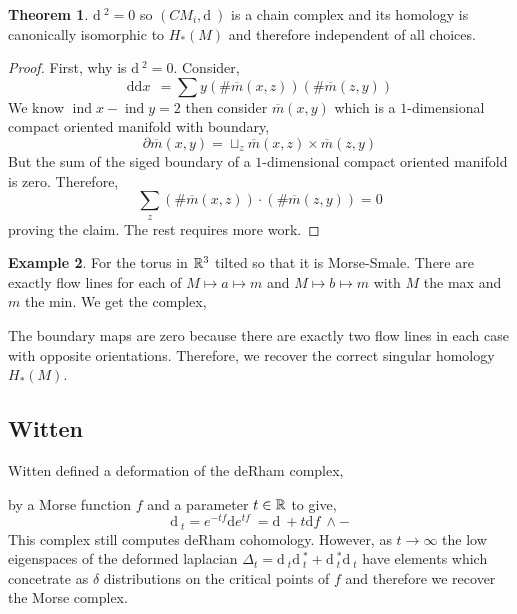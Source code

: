 \documentclass[12pt]{extarticle}
\newcommand{\Z}{\mathbb{Z}}
\renewcommand{\d}[1]{ \mathrm{d}#1 \:}
\DeclareMathOperator{\ind}{\mathrm{ind}}
\theoremstyle{definition}
\newtheorem{theorem}{Theorem}[section]
\newtheorem{example}[theorem]{Example}
\begin{document}
\begin{theorem}
$\d{}^2 = 0$ so $(CM_i, \d{})$ is a chain complex and its homology is canonically isomorphic to $H_*(M)$ and therefore independent of all choices. 
\end{theorem}

\begin{proof}
First, why is $\d{}^2 = 0$. Consider,
\[ \d{\d{x}} = \sum y \left( \# \overline{m}(x,z) \right) \left( \# \overline{m}(z, y) \right) \]
We know $\ind{x} - \ind{y} = 2$ then consider $\overline{m}(x,y)$ which is a $1$-dimensional compact oriented manifold with boundary,
\[ \partial \overline{m}(x,y) = \sqcup_z \overline{m}(x,z) \times \overline{m}(z,y) \]
But the sum of the siged boundary of a $1$-dimensional compact oriented manifold is zero. Therefore,
\[ \sum_z \left( \# \overline{m}(x,z) \right) \cdot \left( \# \overline{m}(z,y) \right) = 0 \]
proving the claim. The rest requires more work.
\end{proof}

\begin{example}
For the torus in $\mathbb{R}^3$ tilted so that it is Morse-Smale. There are exactly flow lines for each of $M \mapsto a \mapsto m$ and $M \mapsto b \mapsto m$ with $M$ the max and $m$ the min. We get the complex,
\begin{center}
\end{center}
The boundary maps are zero because there are exactly two flow lines in each case with opposite orientations. Therefore, we recover the correct singular homology $H_*(M)$. 
\end{example}

\subsection{Witten}

Witten defined a deformation of the deRham complex,
\begin{center}
\end{center}
by a Morse function $f$ and a parameter $t \in \mathbb{R}$ to give,
\[ \d{}_t = e^{-tf} \d{e^{tf}} = \d{} + t \d{f} \wedge - \]
This complex still computes deRham cohomology. However, as $t \to \infty$ the low eigenspaces of the deformed laplacian $\Delta_t = \d{}_t \d{}_t^* + \d{}_t^* \d{}_t$ have elements which concetrate as $\delta$ distributions on the critical points of $f$ and therefore we recover the Morse complex. 
\end{document}
